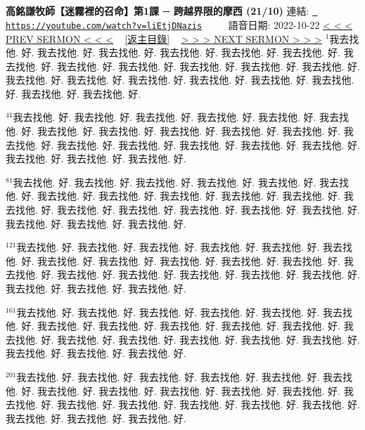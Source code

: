 \documentclass{book}
\begin{document}
\section{}
\label{sec:liEtjDNazis}
\textbf{高銘謙牧師【迷霧裡的召命】第1課 ─ 跨越界限的摩西 (21/10)}
\newline
\newline
連結: \href{https://youtube.com/watch?v=liEtjDNazis}{\texttt{ https://youtube.com/watch?v=liEtjDNazis}} ~~~~ 語音日期: 2022-10-22 
\newline
\newline
\hyperref[sec:GvsPo_gDoyw]{\small{< < < PREV SERMON < < <}}
~
\hyperref[sec:index]{\small{[返主目錄]}}
~
\hyperref[sec:djNxJ0pc_CU]{\small{> > > NEXT SERMON > > >}}
\newline
\newline
$^{1}$我去找他.
好.
我去找他.
好.
我去找他.
好.
我去找他.
好.
我去找他.
好.
我去找他.
好.
我去找他.
好.
我去找他.
好.
我去找他.
好.
我去找他.
好.
我去找他.
好.
我去找他.
好.
我去找他.
好.
我去找他.
好.
我去找他.
好.
我去找他.
好.
我去找他.
好.
我去找他.
好.
我去找他.
好.
我去找他.
好.

$^{41}$我去找他.
好.
我去找他.
好.
我去找他.
好.
我去找他.
好.
我去找他.
好.
我去找他.
好.
我去找他.
好.
我去找他.
好.
我去找他.
好.
我去找他.
好.
我去找他.
好.
我去找他.
好.
我去找他.
好.
我去找他.
好.
我去找他.
好.
我去找他.
好.
我去找他.
好.
我去找他.
好.
我去找他.
好.
我去找他.
好.

$^{81}$我去找他.
好.
我去找他.
好.
我去找他.
好.
我去找他.
好.
我去找他.
好.
我去找他.
好.
我去找他.
好.
我去找他.
好.
我去找他.
好.
我去找他.
好.
我去找他.
好.
我去找他.
好.
我去找他.
好.
我去找他.
好.
我去找他.
好.
我去找他.
好.
我去找他.
好.
我去找他.
好.
我去找他.
好.
我去找他.
好.

$^{121}$我去找他.
好.
我去找他.
好.
我去找他.
好.
我去找他.
好.
我去找他.
好.
我去找他.
好.
我去找他.
好.
我去找他.
好.
我去找他.
好.
我去找他.
好.
我去找他.
好.
我去找他.
好.
我去找他.
好.
我去找他.
好.
我去找他.
好.
我去找他.
好.
我去找他.
好.
我去找他.
好.
我去找他.
好.
我去找他.
好.

$^{161}$我去找他.
好.
我去找他.
好.
我去找他.
好.
我去找他.
好.
我去找他.
好.
我去找他.
好.
我去找他.
好.
我去找他.
好.
我去找他.
好.
我去找他.
好.
我去找他.
好.
我去找他.
好.
我去找他.
好.
我去找他.
好.
我去找他.
好.
我去找他.
好.
我去找他.
好.
我去找他.
好.
我去找他.
好.
我去找他.
好.

$^{201}$我去找他.
好.
我去找他.
好.
我去找他.
好.
我去找他.
好.
我去找他.
好.
我去找他.
好.
我去找他.
好.
我去找他.
好.
我去找他.
好.
我去找他.
好.
我去找他.
好.
我去找他.
好.
我去找他.
好.
我去找他.
好.
我去找他.
好.
我去找他.
好.
我去找他.
好.
我去找他.
好.
我去找他.
好.
我去找他.
好.
\end{document}

